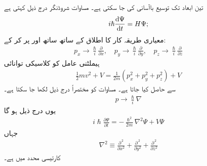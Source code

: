 
تین ابعاد تک توسیع  باآسانی کی جا سکتی ہے۔ مساوات شروڈنگر درج ذیل کہتی ہے
\begin{align}
i\hslash\frac{\dif{\Psi}}{\dif{t}}=H\Psi;
\end{align}
معیاری طریقہ کار کا اطلاق   کے ساتھ ساتھ  اور  پر  کر کے:
\begin{align}\label{مساوات_تین_ابعاد_عاملین_الف}
p_{x}\to \frac{\hslash}{i}\frac{\partial}{\partial{x}},\quad p_{y}\to \frac{\hslash}{i}\frac{\partial}{\partial{y}},\quad p_{z}\to \frac{\hslash}{i}\frac{\partial}{\partial{z}} 
\end{align}
ہیملٹنی عامل  کو کلاسیکی توانائی
\begin{align*}
\frac{1}{2}mv^{2}+V=\frac{1}{2m}(p_{x}^{2}+p_{y}^{2}+p_{z}^{2})+V
\end{align*}
سے حاصل کیا جاتا ہے۔ مساوات  کو مختصراً درج ذیل لکھا  جا سکتا ہے۔
\begin{align}
p\to \frac{\hslash}{i}\nabla
\end{align}
یوں درج ذیل ہو گا
\begin{align}
i\hslash\frac{\partial{\Psi}}{\partial{t}}=-\frac{\hslash^{2}}{2m}\nabla^{2}\Psi+V\Psi
\end{align}
جہاں
\begin{align}
\nabla^{2}\equiv \frac{\partial^{\,2}}{\partial{x^2}}+\frac{\partial^{\,2}}{\partial{y^2}}+\frac{\partial^{\,2}}{\partial{z^2}} 
\end{align}
کارتیسی محدد میں  ہے۔

